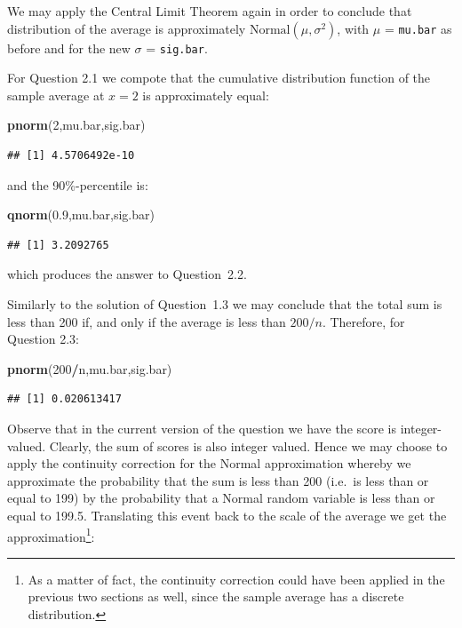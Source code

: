 \documentclass[]{krantz}
\makeatletter
\newenvironment{Shaded}{\begin{snugshade}}{\end{snugshade}}
\newcommand{\DecValTok}[1]{\textcolor[rgb]{0.00,0.00,0.81}{#1}}
\newcommand{\FloatTok}[1]{\textcolor[rgb]{0.00,0.00,0.81}{#1}}
\newcommand{\KeywordTok}[1]{\textcolor[rgb]{0.13,0.29,0.53}{\textbf{#1}}}
\newcommand{\NormalTok}[1]{#1}
\newcommand{\OperatorTok}[1]{\textcolor[rgb]{0.81,0.36,0.00}{\textbf{#1}}}
\newenvironment{kframe}{%
\medskip{}
\setlength{\fboxsep}{.8em}
 \def\at@end@of@kframe{}%
 \ifinner\ifhmode%
  \def\at@end@of@kframe{\end{minipage}}%
  \begin{minipage}{\columnwidth}%
 \fi\fi%
 \def\FrameCommand##1{\hskip\@totalleftmargin \hskip-\fboxsep
 \colorbox{shadecolor}{##1}\hskip-\fboxsep
     \hskip-\linewidth \hskip-\@totalleftmargin \hskip\columnwidth}%
 \MakeFramed {\advance\hsize-\width
   \@totalleftmargin\z@ \linewidth\hsize
   \@setminipage}}%
 {\par\unskip\endMakeFramed%
 \at@end@of@kframe}
\renewenvironment{Shaded}{\begin{kframe}}{\end{kframe}}
\theoremstyle{definition}
\theoremstyle{definition}
\theoremstyle{definition}
\theoremstyle{remark}
\makeatother
\begin{document}
We may apply the Central Limit Theorem again in order to conclude that
distribution of the average is approximately
\(\mathrm{Normal}(\mu, \sigma^2)\), with \(\mu\) = \texttt{mu.bar} as before and
for the new \(\sigma\) = \texttt{sig.bar}.

For Question 2.1 we compote that the cumulative distribution function of
the sample average at \(x=2\) is approximately equal:

\begin{Shaded}
\begin{Highlighting}[]
\KeywordTok{pnorm}\NormalTok{(}\DecValTok{2}\NormalTok{,mu.bar,sig.bar)}
\end{Highlighting}
\end{Shaded}

\begin{verbatim}
## [1] 4.5706492e-10
\end{verbatim}

and the 90\%-percentile is:

\begin{Shaded}
\begin{Highlighting}[]
\KeywordTok{qnorm}\NormalTok{(}\FloatTok{0.9}\NormalTok{,mu.bar,sig.bar)}
\end{Highlighting}
\end{Shaded}

\begin{verbatim}
## [1] 3.2092765
\end{verbatim}

which produces the answer to Question~2.2.

Similarly to the solution of Question~1.3 we may conclude that the total
sum is less than 200 if, and only if the average is less than \(200/n\).
Therefore, for Question 2.3:

\begin{Shaded}
\begin{Highlighting}[]
\KeywordTok{pnorm}\NormalTok{(}\DecValTok{200}\OperatorTok{/}\NormalTok{n,mu.bar,sig.bar)}
\end{Highlighting}
\end{Shaded}

\begin{verbatim}
## [1] 0.020613417
\end{verbatim}

Observe that in the current version of the question we have the score is
integer-valued. Clearly, the sum of scores is also integer valued. Hence
we may choose to apply the continuity correction for the Normal
approximation whereby we approximate the probability that the sum is
less than 200 (i.e.~is less than or equal to 199) by the probability
that a Normal random variable is less than or equal to 199.5.
Translating this event back to the scale of the average we get the
approximation\footnote{As a matter of fact, the continuity correction could have been
  applied in the previous two sections as well, since the sample
  average has a discrete distribution.}:
\end{document}
